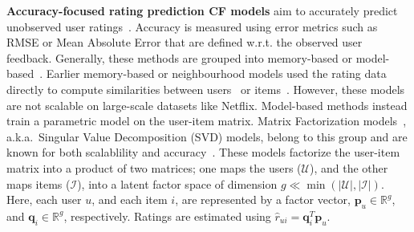 \vspace{4mm}
\noindent \textbf{Accuracy-focused rating prediction CF models} aim to accurately predict unobserved user ratings~\cite{koren2008factorization,lee2012comparative}.  %
Accuracy is measured using  error metrics such as RMSE or Mean Absolute Error that are defined w.r.t. the observed user feedback.
Generally, these methods are grouped into memory-based or model-based~\cite{koren2008factorization}. Earlier memory-based or neighbourhood models used the rating data directly to compute similarities between users~\cite{herlocker1999algorithmic} or items~\cite{sarwar2001item}. However,  these models are not scalable on large-scale datasets like Netflix. Model-based methods  instead train a parametric model on the user-item matrix.  Matrix Factorization models~\cite{koren2008factorization,koren2009matrix}, a.k.a.~Singular Value Decomposition (SVD) models, belong to this group and are  known for both  scalablility and accuracy~\cite{cremonesi2010performance}.  %
 \iffullpaper 
These models factorize the user-item matrix into a product of two matrices; one  maps the users ($\mathcal{U}$), and the other maps items ($\mathcal{I}$), into a latent factor space of dimension $g \ll \min(\vert \mathcal{U} \vert, \vert \mathcal{I} \vert )$. Here,  each user $u$, and each item $i$, are  represented by a factor vector, $\mathbf{p}_u \in \mathbb{R}^{g}$, and $\mathbf{q}_i \in \mathbb{R}^{g}$, respectively. Ratings are estimated using $\hat{r}_{ui} = \mathbf{q}^{T}_i \mathbf{p}_u$. 
